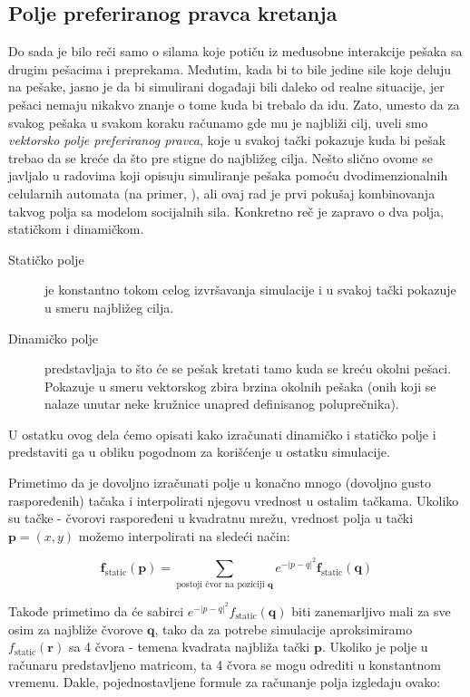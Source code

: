 \documentclass[12pt]{article}
\begin{document}
    \subsection{Polje preferiranog pravca kretanja}
    Do sada je bilo reči samo o silama koje potiču iz međusobne interakcije pešaka sa drugim pešacima i preprekama. Međutim, kada bi to bile jedine sile koje deluju na pešake, jasno je da bi simulirani događaji bili daleko od realne situacije, jer pešaci nemaju nikakvo znanje o tome kuda bi trebalo da idu. Zato, umesto da za svakog pešaka u svakom koraku računamo gde mu je najbliži cilj, uveli smo \emph{vektorsko polje preferiranog pravca}, koje u svakoj tački pokazuje kuda bi pešak trebao da se kreće da što pre stigne do najbližeg cilja. Nešto slično ovome se javljalo u radovima koji opisuju simuliranje pešaka pomoću dvodimenzionalnih celularnih automata (na primer, \citep{Burstedde2001}), ali ovaj rad je prvi pokušaj kombinovanja takvog polja sa modelom socijalnih sila. Konkretno reč je zapravo o dva polja, statičkom i dinamičkom.
    \begin{description}
        \item[Statičko polje] je konstantno tokom celog izvršavanja simulacije i u svakoj tački pokazuje u smeru najbližeg cilja.
        \item[Dinamičko polje] predstavljaja to što će se pešak kretati tamo kuda se kreću okolni pešaci. Pokazuje u smeru vektorskog zbira brzina okolnih pešaka (onih koji se nalaze unutar neke kružnice unapred definisanog poluprečnika).
    \end{description}
    U ostatku ovog dela ćemo opisati kako izračunati dinamičko i statičko polje i predstaviti ga u obliku pogodnom za korišćenje u ostatku simulacije. 
    
    Primetimo da je dovoljno izračunati polje u konačno mnogo (dovoljno gusto raspoređenih) tačaka i interpolirati njegovu vrednost u ostalim tačkama. Ukoliko su tačke - čvorovi raspoređeni u kvadratnu mrežu, vrednost polja u tački $\mathbf p = (x,y)$ možemo interpolirati na sledeći način:
    
    $$
    	\mathbf f_\text{static} (\mathbf p) = \sum_{\text{postoji čvor na poziciji } \mathbf q} e^{-|p-q|^2} \mathbf f_\text{static} (\mathbf q)
    $$
	
	Takođe primetimo da će sabirci $e^{-|p-q|^2} f_\text{static} (\mathbf q)$ biti zanemarljivo mali za sve osim za najbliže čvorove $\mathbf q$, tako da za potrebe simulacije aproksimiramo $f_\text{static} (\mathbf r)$ sa 4 čvora - temena kvadrata najbliža tački $\mathbf p$. Ukoliko je polje u računaru predstavljeno matricom, ta 4 čvora se mogu odrediti u konstantnom vremenu. Dakle, pojednostavljene formule za računanje polja izgledaju ovako:
	
\end{document}
